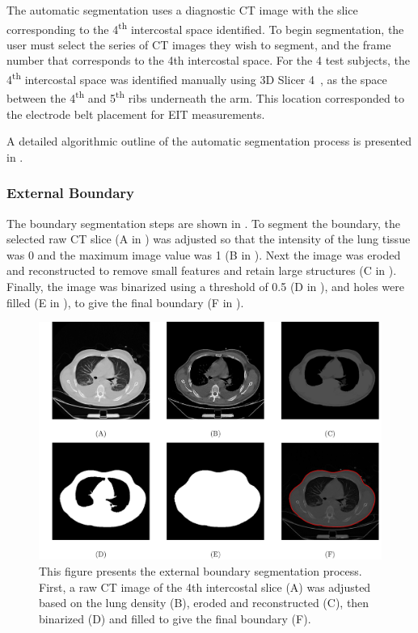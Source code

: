 The automatic segmentation uses a diagnostic CT image 
with the slice corresponding to the 4\textsuperscript{th} intercostal space 
identified. 
To begin segmentation, the user must select the series of CT images they 
wish to segment, and the frame number that corresponds to the 4th intercostal 
space. For the 4 test subjects, the 4\textsuperscript{th} 
intercostal space was identified manually using
3D Slicer 4~\parencite{fedorov_3d_2012}, as the space between the
4\textsuperscript{th} and 5\textsuperscript{th} ribs underneath the arm.
This location corresponded to the electrode belt placement for EIT measurements.

A detailed algorithmic outline of the automatic segmentation process is 
presented in .

\subsubsection{External Boundary} \label{sec:ext_seg}
The boundary segmentation steps are shown in .
To segment the boundary, the selected raw CT slice 
(A in ) 
was adjusted so that the
intensity of the lung tissue was 0 and the maximum image value was 1 
(B in ). 
Next the image was eroded and reconstructed 
to remove small features and retain large structures 
(C in ).
Finally, the image was binarized using a threshold of 0.5 (D in ),
and holes were filled (E in ), 
to give the final boundary (F in ).

\begin{figure}
	\centering
	\includegraphics[width=\textwidth]{chapter5-CT_to_mesh/imgs/boundary_seg_methods.pdf}
	\caption[Boundary segmentation methods.]{\label{fig:ext_seg_methods}%
	This figure presents the external boundary segmentation process. First,
	a raw CT image of the 4th intercostal slice (A) 
	was adjusted based on the lung density (B), 
	eroded and reconstructed (C), then binarized (D) and 
	filled to give the final boundary (F).
	}
\end{figure}

